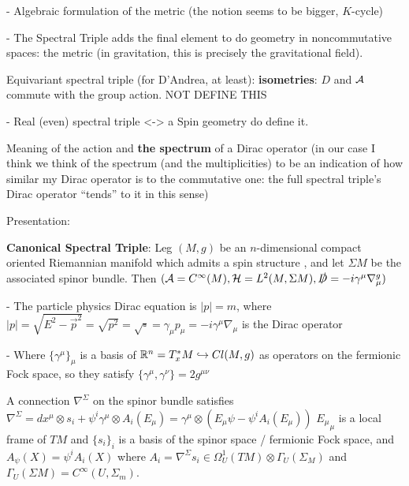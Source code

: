 { \color{gray}
     - Algebraic formulation of the metric (the notion seems to be bigger, $K$-cycle)
    
     - The Spectral Triple adds the final element to do geometry in noncommutative spaces: the metric (in gravitation, this is precisely the gravitational field).
     
     Equivariant spectral triple (for D'Andrea, at least): \textbf{isometries}: $D$ and $\mathcal A$ commute with the group action. NOT DEFINE THIS
     
     - Real (even) spectral triple <-> a Spin geometry do define it.
    
    Meaning of the action and \textbf{the spectrum} of a Dirac operator (in our case I think we think of the spectrum (and the multiplicities) to be an indication of how similar my Dirac operator is to the commutative one: the full spectral triple's Dirac operator ``tends'' to it in this sense)
    
    Presentation:
        
        \textbf{Canonical Spectral Triple}: Leg $(M, g)$ be an $n$-dimensional compact oriented Riemannian manifold which admits a spin structure%
        , and let $\Sigma M$ %
        be the associated spinor bundle. Then $(\mathcal A = C^\infty(M), \mathcal H = L^2(M, \Sigma M), \slashed D = -i \gamma^\mu \nabla^g_\mu)$%
        
            \quad - The particle physics Dirac equation is $|p| = m$, where $|p| = \sqrt{E^2 - \vec p^2} = \sqrt{p^2} = \sqrt{\square} = \gamma_\mu p_\mu = -i \gamma^\mu \nabla_\mu$ is the Dirac operator
            
            \quad - Where $\{\gamma^\mu\}_\mu$ is a basis of $\mathbb{R}^n = T^*_x M \hookrightarrow Cl(M, g)$ as operators on the fermionic Fock space, so they satisfy $\{\gamma^\mu, \gamma^\nu\} = 2 g^{\mu \nu}$
            
            \quad A connection $\nabla^\Sigma$ on the spinor bundle satisfies $\nabla^\Sigma = dx^\mu \otimes s_i + \psi^i \gamma^\mu \otimes A_i(E_\mu) = \gamma^\mu \otimes (E_\mu \psi - \psi^i A_i(E_\mu))$   ${E_\mu}_\mu$ is a local frame of $T M$ and $\{s_i\}_i$ is a basis of the spinor space / fermionic Fock space, and $A_\psi(X) = \psi^i A_i(X)$ where $A_i = \nabla^\Sigma s_i \in \Omega_U^1(TM) \otimes \Gamma_U(\Sigma_M)$ and $\Gamma_U(\Sigma M) = C^\infty(U, \Sigma_m)$.
        
}
